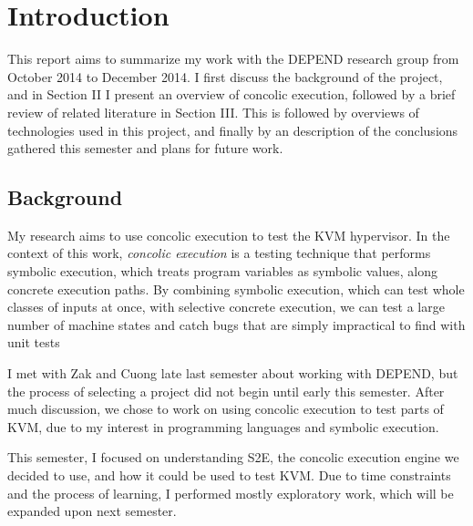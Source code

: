 \documentclass[11pt]{article}
\begin{document}
\maketitle

\section{Introduction}
This report aims to summarize my work with the DEPEND research group from
October 2014 to December 2014. I first discuss the background of the project,
and in Section II I present an overview of concolic execution, followed by a
brief review of related literature in Section III. This is followed by overviews
of technologies used in this project, and finally by an description of the
conclusions gathered this semester and plans for future work. 

\subsection{Background}
My research aims to use concolic execution to
test the KVM hypervisor. In the context of this work, \textit{concolic
execution} is a testing technique that performs symbolic execution, which
treats program variables as symbolic values, along concrete execution
paths. By combining symbolic execution, which can test whole classes of
inputs at once, with selective concrete execution, we can test a large number of
machine states and catch bugs that are simply impractical to find with unit
tests \par
 
I met with Zak and Cuong late last semester about working with DEPEND, but the
process of selecting a project did not begin until early this semester. After
much discussion, we chose to work on using concolic execution to test parts of
KVM, due to my interest in programming languages and symbolic execution. \par
This
semester, I focused on understanding S2E, the concolic execution engine we
decided to use, and how it could be used to test KVM. Due to time constraints
and the process of learning, I performed mostly exploratory work, which will be
expanded upon next semester.
\end{document}
